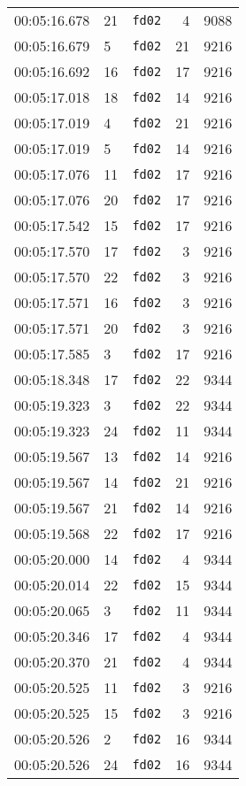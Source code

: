 \documentclass{article}
\begin{document}
\begin{longtable}{lllrr}
00:05:16.678 & 21 & \texttt{fd02} & 4 & 9088 \\
00:05:16.679 & 5 & \texttt{fd02} & 21 & 9216 \\
00:05:16.692 & 16 & \texttt{fd02} & 17 & 9216 \\
00:05:17.018 & 18 & \texttt{fd02} & 14 & 9216 \\
00:05:17.019 & 4 & \texttt{fd02} & 21 & 9216 \\
00:05:17.019 & 5 & \texttt{fd02} & 14 & 9216 \\
00:05:17.076 & 11 & \texttt{fd02} & 17 & 9216 \\
00:05:17.076 & 20 & \texttt{fd02} & 17 & 9216 \\
00:05:17.542 & 15 & \texttt{fd02} & 17 & 9216 \\
00:05:17.570 & 17 & \texttt{fd02} & 3 & 9216 \\
00:05:17.570 & 22 & \texttt{fd02} & 3 & 9216 \\
00:05:17.571 & 16 & \texttt{fd02} & 3 & 9216 \\
00:05:17.571 & 20 & \texttt{fd02} & 3 & 9216 \\
00:05:17.585 & 3 & \texttt{fd02} & 17 & 9216 \\
00:05:18.348 & 17 & \texttt{fd02} & 22 & 9344 \\
00:05:19.323 & 3 & \texttt{fd02} & 22 & 9344 \\
00:05:19.323 & 24 & \texttt{fd02} & 11 & 9344 \\
00:05:19.567 & 13 & \texttt{fd02} & 14 & 9216 \\
00:05:19.567 & 14 & \texttt{fd02} & 21 & 9216 \\
00:05:19.567 & 21 & \texttt{fd02} & 14 & 9216 \\
00:05:19.568 & 22 & \texttt{fd02} & 17 & 9216 \\
00:05:20.000 & 14 & \texttt{fd02} & 4 & 9344 \\
00:05:20.014 & 22 & \texttt{fd02} & 15 & 9344 \\
00:05:20.065 & 3 & \texttt{fd02} & 11 & 9344 \\
00:05:20.346 & 17 & \texttt{fd02} & 4 & 9344 \\
00:05:20.370 & 21 & \texttt{fd02} & 4 & 9344 \\
00:05:20.525 & 11 & \texttt{fd02} & 3 & 9216 \\
00:05:20.525 & 15 & \texttt{fd02} & 3 & 9216 \\
00:05:20.526 & 2 & \texttt{fd02} & 16 & 9344 \\
00:05:20.526 & 24 & \texttt{fd02} & 16 & 9344 \\

\end{longtable}
\end{document}
